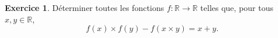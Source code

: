\documentclass[a4paper, 11pt,openany]{article}%
\theoremstyle{plain}
\theoremstyle{definition}
\newtheorem{exo}{Exercice}
\newtheorem{sol}{Solution de l'exercice}
\theoremstyle{remark}
\newcommand{\R}{\mathbb{R}}
\begin{document}

\begin{exo}
Déterminer toutes les fonctions $f:\R \to \R$ telles que, pour tous $x,y \in \R$, 
\[ f(x) \times f(y) -f(x \times y)=x+y.\]
\end{exo}

   
\end{document}

